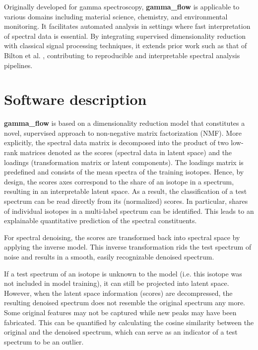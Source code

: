 \documentclass[preprint,12pt, a4paper]{elsarticle}
\begin{document}
Originally developed for gamma spectroscopy, \textbf{gamma\_flow} is applicable to various domains including material science, chemistry, and environmental monitoring. It facilitates automated analysis in settings where fast interpretation of spectral data is essential. By integrating supervised dimensionality reduction with classical signal processing techniques, it extends prior work such as that of Bilton et al. \cite{Bilton2019}, contributing to reproducible and interpretable spectral analysis pipelines.



\section{Software description}
\label{sec:software_description}

\textbf{gamma\_flow} is based on a dimensionality reduction model that constitutes a novel, supervised approach to non-negative matrix factorization (NMF). More explicitly, the spectral data matrix is decomposed into the product of two low-rank matrices denoted as the scores (spectral data in latent space) and the loadings (transformation matrix or latent components). The loadings matrix is predefined and consists of the mean spectra of the training isotopes. Hence, by design, the scores axes correspond to the share of an isotope in a spectrum, resulting in an interpretable latent space. As a result, the classification of a test spectrum can be read directly from its (normalized) scores. In particular, shares of individual isotopes in a multi-label spectrum can be identified. This leads to an explainable quantitative prediction of the spectral constituents. 

For spectral denoising, the scores are transformed back into spectral space by applying the inverse model. This inverse transformation rids the test spectrum of noise and results in a smooth, easily recognizable denoised spectrum. 

If a test spectrum of an isotope is unknown to the model (i.e. this isotope was not included in model training), it can still be projected into latent space. However, when the latent space information (scores) are decompressed, the resulting denoised spectrum does not resemble the original spectrum any more. Some original features may not be captured while new peaks may have been fabricated. This can be quantified by calculating the cosine similarity between the original and the denoised spectrum, which can serve as an indicator of a test spectrum 
to be an outlier.
\end{document}
